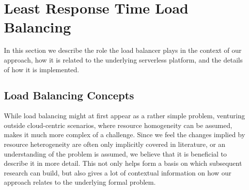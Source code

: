 \section{Least Response Time Load Balancing}
In this section we describe the role the load balancer plays in the context of our approach, how it is related to the underlying serverless platform, and the details of how it is implemented.

\subsection{Load Balancing Concepts}
While load balancing might at first appear as a rather simple problem, venturing outside cloud-centric scenarios, where resource homogeneity can be assumed, makes it much more complex of a challenge.
Since we feel the changes implied by resource heterogeneity are often only implicitly covered in literature, or an understanding of the problem is assumed, we believe that it is beneficial to describe it in more detail. This not only helps form a basis on which subsequent research can build, but also gives a lot of contextual information on how our approach relates to the underlying formal problem.

